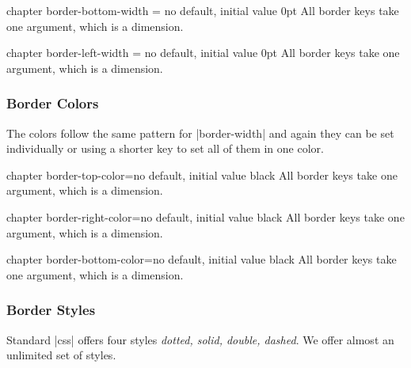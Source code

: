 \begin{docKey}[]{chapter border-bottom-width}{ = }{no default, initial value 0pt}
All border keys take one argument, which is a dimension.
\end{docKey}

\begin{docKey}[]{chapter border-left-width}{ = }{no default, initial value 0pt}
All border keys take one argument, which is a dimension.
\end{docKey}

\subsubsection{Border Colors}

The colors follow the same pattern for |border-width| and again they can be set individually or using
a shorter key to set all of them in one color. 

\begin{docKey}[]{chapter border-top-color}{=}{no default, initial value black}
All border keys take one argument, which is a dimension.
\end{docKey}

\begin{docKey}[]{chapter border-right-color}{=}{no default, initial value black}
All border keys take one argument, which is a dimension.
\end{docKey}

\begin{docKey}[]{chapter border-bottom-color}{=}{no default, initial value black}
All border keys take one argument, which is a dimension.
\end{docKey}




\subsubsection{Border Styles}

Standard |css|  offers four styles \emph{dotted, solid, double, dashed}. We offer almost an unlimited set of styles.

